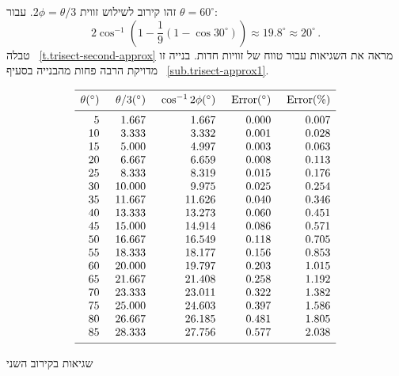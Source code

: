 זהו קירוב לשילוש זווית 
$2\phi=\theta/3$.
עבור
$\theta=60^\circ$:
\[
2\cos^{-1}\left(1 - \frac{1}{9}(1-\cos 30^\circ)\right)\approx 19.8^\circ\approx 20^\circ\,.
\]
טבלה%
~\ref{t.trisect-second-approx}
מראה את השגיאות עבור טווח של זוויות חדות. בנייה זו מדויקת הרבה פחות מהבנייה בסעיף%
~\ref{sub.trisect-approx1}.

\begin{table}[t]
\[
\begin{array}{r@{\hspace{5mm}}r@{\hspace{5mm}}r@{\hspace{5mm}}r@{\hspace{5mm}}r}
\hline
\noalign{\smallskip}
\theta ({}^\circ) & \theta/3 ({}^\circ)& \cos^{-1} 2\phi ({}^\circ) & \mathrm{Error} ({}^\circ) & \mathrm{Error (\%)}\\
\noalign{\smallskip}\hline\noalign{\smallskip}
  5 &    1.667 &    1.667  &     0.000 &    0.007 \\
 10 &    3.333 &    3.332  &     0.001 &    0.028 \\
 15 &    5.000 &    4.997  &     0.003 &    0.063 \\
 20 &    6.667 &    6.659  &     0.008 &    0.113 \\
 25 &    8.333 &    8.319  &     0.015 &    0.176 \\
 30 &   10.000 &    9.975  &     0.025 &    0.254 \\
 35 &   11.667 &   11.626  &     0.040 &    0.346 \\
 40 &   13.333 &   13.273  &     0.060 &    0.451 \\
 45 &   15.000 &   14.914  &     0.086 &    0.571 \\
 50 &   16.667 &   16.549  &     0.118 &    0.705 \\
 55 &   18.333 &   18.177  &     0.156 &    0.853 \\
 60 &   20.000 &   19.797  &     0.203 &    1.015 \\
 65 &   21.667 &   21.408  &     0.258 &    1.192 \\
 70 &   23.333 &   23.011  &     0.322 &    1.382 \\
 75 &   25.000 &   24.603  &     0.397 &    1.586 \\
 80 &   26.667 &   26.185  &     0.481 &    1.805 \\
 85 &   28.333 &   27.756  &     0.577 &    2.038 \\
 \noalign{\smallskip}
 \hline
 \end{array}
\]
\caption{שגיאות בקירוב השני}
\label{t.trisect-second-approx}
\end{table}


